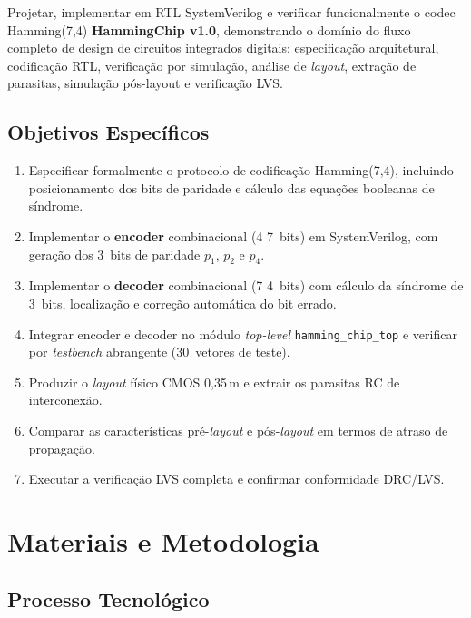 \documentclass[12pt,a4paper]{article}
\begin{document}
Projetar, implementar em RTL SystemVerilog e verificar funcionalmente o codec Hamming(7,4) \textbf{HammingChip v1.0}, demonstrando o domínio do fluxo completo de design de circuitos integrados digitais: especificação arquitetural, codificação RTL, verificação por simulação, análise de \textit{layout}, extração de parasitas, simulação pós-layout e verificação LVS.

\subsection{Objetivos Específicos}

\begin{enumerate}[leftmargin=2em,label=\textbf{O\arabic*.}]
  \item Especificar formalmente o protocolo de codificação Hamming(7,4), incluindo posicionamento dos bits de paridade e cálculo das equações booleanas de síndrome.
  \item Implementar o \textbf{encoder} combinacional (4\,\textrightarrow\,7~bits) em SystemVerilog, com geração dos 3~bits de paridade $p_1$, $p_2$ e $p_4$.
  \item Implementar o \textbf{decoder} combinacional (7\,\textrightarrow\,4~bits) com cálculo da síndrome de 3~bits, localização e correção automática do bit errado.
  \item Integrar encoder e decoder no módulo \textit{top-level} \texttt{hamming\_chip\_top} e verificar por \textit{testbench} abrangente (30~vetores de teste).
  \item Produzir o \textit{layout} físico CMOS 0,35\,\textmu m e extrair os parasitas RC de interconexão.
  \item Comparar as características pré-\textit{layout} e pós-\textit{layout} em termos de atraso de propagação.
  \item Executar a verificação LVS completa e confirmar conformidade DRC/LVS.
\end{enumerate}

\section{Materiais e Metodologia}

\subsection{Processo Tecnológico}
\end{document}
